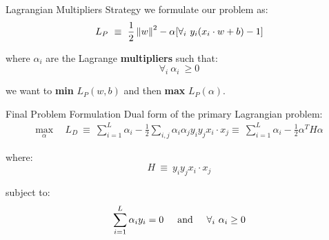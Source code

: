 \begin{frame}[fragile]{Lagrangian Multipliers Strategy}
  we formulate our problem as:
  \newline
  \begin{equation*}
    \begin{split}
      L_P\ \equiv\ \frac{1}{2} \left\lVert w\right\rVert^2 - \alpha [\forall_i\  y_i (x_i \cdot w + b) - 1]
    \end{split}
  \end{equation*}

  where $\alpha_i$ are the Lagrange \textbf{multipliers} such that:
  \begin{equation*}
    \forall_i\ \alpha_i\ \geq 0 
  \end{equation*}

  we want to \textbf{min} $L_P(w,b)$ and then \textbf{max} $L_P(\alpha)$.
\end{frame}


\begin{frame}[fragile]{Final Problem Formulation}
  Dual form of the primary Lagrangian problem:
  \newline
  \begin{equation*}
    \begin{split}
      \max_{\alpha}\ &\ L_D\ \equiv\ \sum_{i=1}^{L} \alpha_i - \frac{1}{2} \sum_{i,j} \alpha_i \alpha_j y_i y_j x_i \cdot x_j
      \equiv\ \sum_{i=1}^{L} \alpha_i - \frac{1}{2} \alpha^T H \alpha
    \end{split}
  \end{equation*}

  where:
  \newline
  \begin{equation*}
    H\ \equiv\ y_i y_j x_i \cdot x_j
  \end{equation*}

  subject to:
  \newline
  \begin{equation*}
    \sum_{i=1}^{L} \alpha_i y_i = 0 \hspace{.5cm} \text{and} 
    \hspace{.5cm} 
    \forall_i\ \alpha_i \geq 0 
  \end{equation*}
\end{frame}
